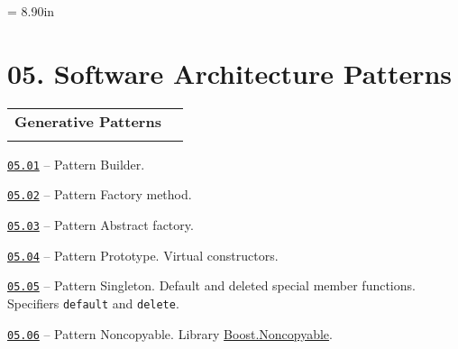 \documentclass[a4paper,12pt]{article}
\renewenvironment{itemize}
{
    \begin{list}{\labelitemi}
    {
      \setlength{\topsep}{0pt}
      \setlength{\partopsep}{0pt}
      \setlength{\parskip}{0pt}
      \setlength{\itemsep}{0pt}
      \setlength{\parsep}{0pt}
      \setlength{\leftmargin}{14.5pt}
    }
}{\end{list}}
\begin{document}
\newpage\thispagestyle{empty}\pdfpageheight = 8.90in\enlargethispage{100in}

\section{05. Software Architecture Patterns}

\begin{tabular}{!{\vrule width 1pt}L{3.9cm}!{\vrule width 1pt}L{15.1cm}!{\vrule width 0pt}} 


\textbf{Generative Patterns} & \\


\end{tabular}

\medskip\smallskip

\begin{itemize}

    \item \href{https://github.com/i-s-m-mipt/Education/blob/master/projects/examples/source/05.01.cpp}{\texttt{05.01}} -- Pattern Builder. 

    \smallskip

    \item \href{https://github.com/i-s-m-mipt/Education/blob/master/projects/examples/source/05.02.cpp}{\texttt{05.02}} -- Pattern Factory method.

    \smallskip

    \item \href{https://github.com/i-s-m-mipt/Education/blob/master/projects/examples/source/05.03.cpp}{\texttt{05.03}} -- Pattern Abstract factory. 

    \smallskip

    \item \href{https://github.com/i-s-m-mipt/Education/blob/master/projects/examples/source/05.04.cpp}{\texttt{05.04}} -- Pattern Prototype. Virtual constructors.

    \smallskip

    \item \href{https://github.com/i-s-m-mipt/Education/blob/master/projects/examples/source/05.05.cpp}{\texttt{05.05}} -- Pattern Singleton. Default and deleted special member functions. Specifiers \lstinline{default} and \lstinline{delete}.

    \smallskip

    \item \href{https://github.com/i-s-m-mipt/Education/blob/master/projects/examples/source/05.06.cpp}{\texttt{05.06}} -- Pattern Noncopyable. Library \href{https://www.boost.org/doc/libs/1_85_0/libs/core/doc/html/index.html}{Boost.Noncopyable}.

\end{itemize}
\end{document}
